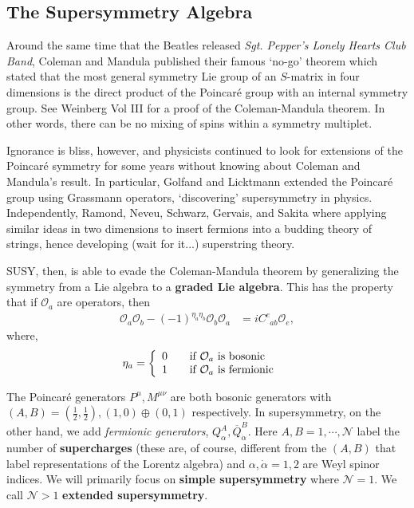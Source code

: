 \documentclass[12pt, oneside]{report}    %
\begin{document}
\subsection{The Supersymmetry Algebra}

Around the same time that the Beatles released \emph{Sgt. Pepper's Lonely Hearts Club Band}, Coleman and Mandula published their famous `no-go' theorem which stated that the most general symmetry Lie group of an $S$-matrix in four dimensions is the direct product of the Poincar\'e group with an internal symmetry group. See Weinberg Vol III for a proof of the Coleman-Mandula theorem. In other words, there can be no mixing of spins within a symmetry multiplet. 

Ignorance is bliss, however, and physicists continued to look for extensions of the Poincar\'e symmetry for some years without knowing about Coleman and Mandula's result. In particular, Golfand and Licktmann extended the Poincar\'e group using Grassmann operators, `discovering' supersymmetry in physics. Independently, Ramond, Neveu, Schwarz, Gervais, and Sakita where applying similar ideas in two dimensions to insert fermions into a budding theory of strings, hence developing (wait for it...) superstring theory.

SUSY, then, is able to evade the Coleman-Mandula theorem by generalizing the symmetry from a Lie algebra to a \textbf{graded Lie algebra}. This has the property that if $\mathcal O_a$ are operators, then
\begin{align}
    \mathcal O_a\mathcal O_b - (-1)^{\eta_a\eta_b}\mathcal O_b\mathcal O_a &= i C^{e}_{\phantom{e}ab}\mathcal O_e,\label{eq:SUSYalg:gradedalg}
\end{align}
where,
\begin{align}
    \eta_a &= \left\{ 
    \begin{array}{l l}
      0 & \quad \mbox{if $\mathcal O_a$ is bosonic}\\
      1 & \quad \mbox{if $\mathcal O_a$ is fermionic}\\
    \end{array} \right.
\end{align} 

The Poincar\'e generators $P^\mu, M^{\mu\nu}$ are both bosonic generators with $(A,B)=(\frac 12, \frac 12), (1,0)\oplus(0,1)$ respectively. In supersymmetry, on the other hand, we add \textit{fermionic generators}, $Q^A_\alpha, \overline Q^B_{\dot\alpha}$. Here $A,B = 1, \cdots, \mathcal N$ label the number of \textbf{supercharges} (these are, of course, different from the $(A,B)$ that label representations of the Lorentz algebra) and $\alpha, \dot\alpha = 1, 2$ are Weyl spinor indices. We will primarily focus on \textbf{simple supersymmetry} where $\mathcal N = 1$. We call $\mathcal N >1$ \textbf{extended supersymmetry}.
\end{document}
